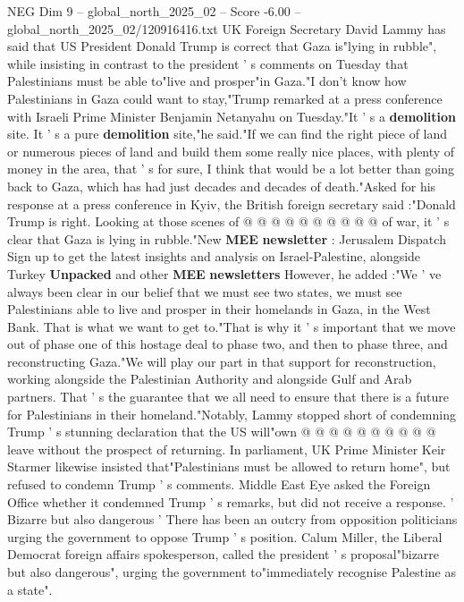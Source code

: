 \begin{textsample}{NEG Dim 9 – global\_north\_2025\_02 – Score -6.00 – global\_north\_2025\_02/120916416.txt}  \label{ex:f9_neg_010}
UK Foreign Secretary David Lammy has said that US President Donald Trump is correct that Gaza is"lying in rubble", while insisting in contrast to the president ' s comments on Tuesday that Palestinians must be able to"live and prosper"in Gaza."I don't know how Palestinians in Gaza could want to stay,"Trump remarked at a press conference with Israeli Prime Minister Benjamin Netanyahu on Tuesday."It ' s a \textbf{demolition} site.
It ' s a pure \textbf{demolition} site,"he said."If we can find the right piece of land or numerous pieces of land and build them some really nice places, with plenty of money in the area, that ' s for sure, I think that would be a lot better than going back to Gaza, which has had just decades and decades of death."Asked for his response at a press conference in Kyiv, the British foreign secretary said :"Donald Trump is right.
Looking at those scenes of @ @ @ @ @ @ @ @ @ @ of war, it ' s clear that Gaza is lying in rubble."New \textbf{MEE} \textbf{newsletter} : Jerusalem Dispatch Sign up to get the latest insights and analysis on Israel-Palestine, alongside Turkey \textbf{Unpacked} and other \textbf{MEE} \textbf{newsletters} However, he added :"We ' ve always been clear in our belief that we must see two states, we must see Palestinians able to live and prosper in their homelands in Gaza, in the West Bank.
That is what we want to get to."That is why it ' s important that we move out of phase one of this hostage deal to phase two, and then to phase three, and reconstructing Gaza."We will play our part in that support for reconstruction, working alongside the Palestinian Authority and alongside Gulf and Arab partners.
That ' s the guarantee that we all need to ensure that there is a future for Palestinians in their homeland."Notably, Lammy stopped short of condemning Trump ' s stunning declaration that the US will"own @ @ @ @ @ @ @ @ @ @ leave without the prospect of returning.
In parliament, UK Prime Minister Keir Starmer likewise insisted that"Palestinians must be allowed to return home", but refused to condemn Trump ' s comments.
Middle East Eye asked the Foreign Office whether it condemned Trump ' s remarks, but did not receive a response. ' Bizarre but also dangerous ' There has been an outcry from opposition politicians urging the government to oppose Trump ' s position.
Calum Miller, the Liberal Democrat foreign affairs spokesperson, called the president ' s proposal"bizarre but also dangerous", urging the government to"immediately recognise Palestine as a state".

\end{textsample}

